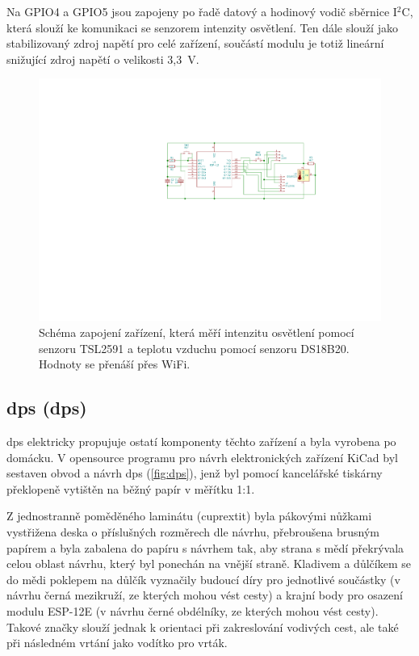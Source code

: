         Na GPIO4 a GPIO5 jsou zapojeny po řadě datový a hodinový vodič sběrnice I$^2$C, která slouží ke komunikaci se senzorem intenzity osvětlení. Ten dále slouží jako stabilizovaný zdroj napětí pro celé zařízení, součástí modulu je totiž lineární snižující zdroj napětí o velikosti 3{,}3~V.
        \begin{figure}
            \centering
            \includegraphics[draft=\draftfig,width=\textwidth,trim={10.8cm 10cm 5.5cm 5.3cm},clip]{img/hw/esp_lux_temp_sch.pdf}
            \caption[Schéma zapojení měřicích zařízení]{Schéma zapojení zařízení, která měří intenzitu osvětlení pomocí senzoru TSL2591 a teplotu vzduchu pomocí senzoru DS18B20. Hodnoty se přenáší přes WiFi.}
            \label{fig:schema}
        \end{figure}
    \subsection{\Acrlong{dps} (\acrshort{dps})}
        \acrshort{dps} elektricky propujuje ostatí komponenty těchto zařízení a byla vyrobena po domácku. V opensource programu pro návrh elektronických zařízení KiCad byl sestaven obvod a návrh \acrshort{dps} (\cref{fig:dps}), jenž byl pomocí kancelářské tiskárny překlopeně vytištěn na běžný papír v měřítku 1:1.
        
        Z jednostranně poměděného laminátu (cuprextit) byla pákovými nůžkami vystřižena deska o příslušných rozměrech dle návrhu, přebroušena brusným papírem a byla zabalena do papíru s návrhem tak, aby strana s mědí překrývala celou oblast návrhu, který byl ponechán na vnější straně. Kladivem a důlčíkem se do mědi poklepem na důlčík vyznačily budoucí díry pro jednotlivé součástky (v návrhu černá mezikruží, ze kterých mohou vést cesty) a krajní body pro osazení modulu ESP-12E (v návrhu černé obdélníky, ze kterých mohou vést cesty). Takové značky slouží jednak k orientaci při zakreslování vodivých cest, ale také při následném vrtání jako vodítko pro vrták.
        
